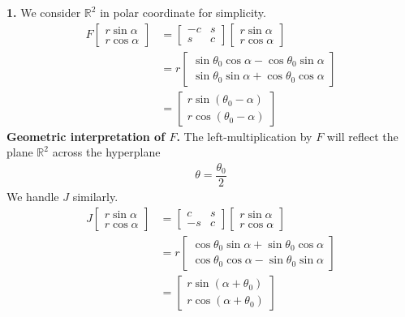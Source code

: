 \documentclass[a4paper,oneside]{book}
\numberwithin{equation}{chapter}
\begin{document}
\textbf{1.} We consider $\mathbb{R}^2$ in polar coordinate  for simplicity.
\begin{align}
F\left[ {\begin{array}{*{20}{c}}
{r\sin \alpha }\\
{r\cos \alpha }
\end{array}} \right] &= \left[ {\begin{array}{*{20}{c}}
{ - c}&s\\
s&c
\end{array}} \right]\left[ {\begin{array}{*{20}{c}}
{r\sin \alpha }\\
{r\cos \alpha }
\end{array}} \right]\\
& = r\left[ {\begin{array}{*{20}{c}}
{  \sin \theta _0\cos \alpha - \cos \theta _0 \sin \alpha }\\
{\sin \theta _0\sin \alpha  + \cos \theta _0\cos \alpha }
\end{array}} \right]\\
& = \left[ {\begin{array}{*{20}{c}}
{r\sin \left( {\theta _0 - \alpha } \right)}\\
{r\cos \left( {\theta _0 - \alpha } \right)}
\end{array}} \right]
\end{align}
\textbf{Geometric interpretation of $F$.} The left-multiplication by $F$ will reflect the plane $\mathbb{R}^2$ across the hyperplane 
\begin{align}
\theta  = \dfrac{{{\theta _0}}}{2}
\end{align}
We handle $J$ similarly. 
\begin{align}
J\left[ {\begin{array}{*{20}{c}}
{r\sin \alpha }\\
{r\cos \alpha }
\end{array}} \right] &= \left[ {\begin{array}{*{20}{c}}
c&s\\
{ - s}&c
\end{array}} \right]\left[ {\begin{array}{*{20}{c}}
{r\sin \alpha }\\
{r\cos \alpha }
\end{array}} \right]\\
& = r\left[ {\begin{array}{*{20}{c}}
{\cos {\theta _0}\sin \alpha  + \sin {\theta _0}\cos \alpha }\\
{ \cos {\theta _0}\cos \alpha- \sin {\theta _0}\sin \alpha   }
\end{array}} \right]\\
& = \left[ {\begin{array}{*{20}{c}}
{r\sin \left( {\alpha  + {\theta _0}} \right)}\\
{r\cos \left( {\alpha  + {\theta _0}} \right)}
\end{array}} \right]
\end{align}
\end{document}
